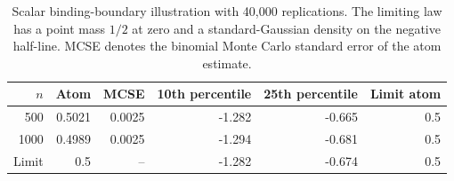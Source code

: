 \begin{table}[H]
\centering
\caption{Scalar binding-boundary illustration with 40,000 replications. The limiting law has a point mass $1/2$ at zero and a standard-Gaussian density on the negative half-line. MCSE denotes the binomial Monte Carlo standard error of the atom estimate.}
\label{Table: boundary illustration}
\small
\begin{tabular}{rrrrrr}
\hline
$n$ & Atom & MCSE & 10th percentile & 25th percentile & Limit atom \\
\hline
500 & 0.5021 & 0.0025 & -1.282 & -0.665 & 0.5 \\
1000 & 0.4989 & 0.0025 & -1.294 & -0.681 & 0.5 \\
Limit & 0.5 & -- & -1.282 & -0.674 & 0.5 \\
\hline
\end{tabular}
\end{table}
